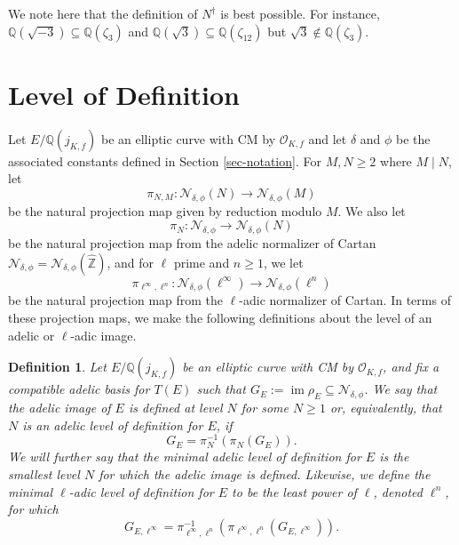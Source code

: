 \documentclass[11pt]{amsart}
\newtheorem{definition}[defn]{Definition}
\newtheorem{corollary}[defn]{Corollary}
\theoremstyle{definition}
\newcommand{\Q}{\mathbb{Q}}
\newcommand{\Z}{\mathbb{Z}}
\newcommand{\Of}{\mathcal{O}_{K,f}}
\DeclareMathOperator{\im}{im}  %
\begin{document}
We note here that the definition of $N^\dagger$ is best possible. For instance, $\Q(\sqrt{-3})\subseteq \Q(\zeta_3)$ and $\Q(\sqrt{3})\subseteq \Q(\zeta_{12})$ but $\sqrt{3}\not\in \Q(\zeta_3)$.












\section{Level of Definition}\label{sec-level}

Let $E/\Q(j_{K,f})$ be an elliptic curve with CM by $\Of$ and let $\delta$ and $\phi$ be the associated constants defined in Section \ref{sec-notation}. For $M,N \geq 2$ where $M \mid N$, let
\[ \pi_{N,M} \colon \mathcal{N}_{\delta, \phi}(N) \to \mathcal{N}_{\delta, \phi}(M) \]
be the natural projection map given by reduction modulo $M$.
We also let
\[ \pi_{N} \colon  \mathcal{N}
_{\delta, \phi} \to \mathcal{N}_{\delta, \phi}(N) \]
be the natural projection map from the adelic normalizer of Cartan $\mathcal{N}
_{\delta, \phi}=\mathcal{N}
_{\delta, \phi}(\widehat{\Z})$, and for $\ell$ prime and $n \geq 1$, we let
\[ \pi_{\ell^{\infty}, \ell^n} \colon \mathcal{N}_{\delta, \phi}(\ell^{\infty}) \to \mathcal{N}_{\delta, \phi}(\ell^{n}) \]
be the natural projection map from the $\ell$-adic normalizer of Cartan. In terms of these projection maps, we make the following definitions about the level of an adelic or $\ell$-adic image.


\begin{definition}\label{def-level-of-definition}
    Let $E/\Q(j_{K, f})$ be an elliptic curve with CM by $\Of$, and fix a compatible adelic basis for $T(E)$ such that  $G_{E} := \im \rho_{E} \subseteq \mathcal{N}_{\delta, \phi}$. We say that the adelic image of $E$ is \emph{defined at level $N$} for some $N \geq 1$ or, equivalently, that $N$ is an \emph{adelic level of definition for $E$}, if \[ G_{E} = \pi_N^{-1}(\pi_N(G_{E})). \] We will further say that the \emph{minimal adelic level of definition for $E$} is the smallest level $N$ for which the adelic image is defined. Likewise, we define the \emph{minimal $\ell$-adic level of definition for $E$} to be the least power of $\ell$, denoted $\ell^n$, for which \[ G_{E, \ell^{\infty}} = \pi_{\ell^{\infty}, \ell^n}^{-1}(\pi_{\ell^{\infty}, \ell^n}(G_{E, \ell^{\infty}})). \]
\end{definition}
\end{document}
